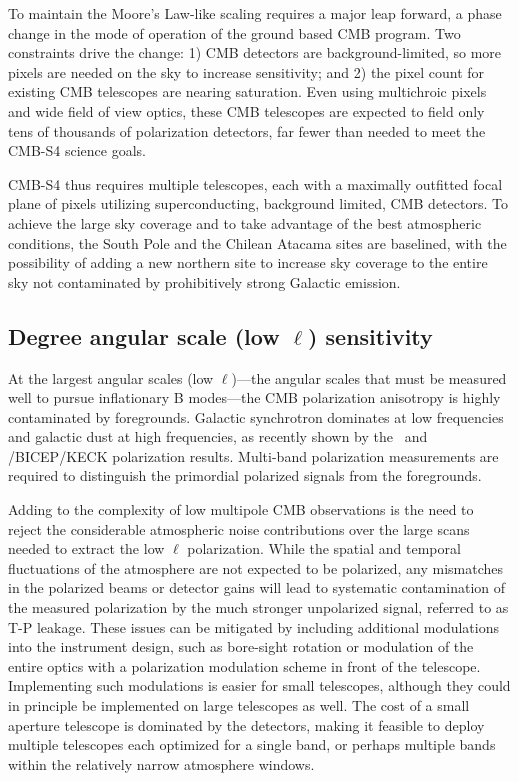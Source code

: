 To maintain the Moore's Law-like scaling requires a major leap forward, a phase change in the mode of operation of the ground based CMB program.  Two constraints drive the change:  1) CMB detectors are background-limited, so more pixels are needed on the sky to increase sensitivity; and 2) the pixel count for existing CMB telescopes are nearing saturation.  Even using multichroic pixels and wide field of view optics, these CMB telescopes are expected to field only tens of thousands of polarization detectors, far fewer than needed to meet the CMB-S4 science goals. 

CMB-S4 thus requires multiple telescopes, each with a maximally outfitted focal plane of pixels utilizing superconducting, background limited, CMB detectors. To achieve the large sky coverage and to take advantage of the best atmospheric conditions, the South Pole and the Chilean Atacama sites are baselined, with the possibility of adding a new northern site to increase sky coverage to the entire sky not contaminated by prohibitively strong Galactic emission.

\subsection{Degree angular scale (low $\ell$) sensitivity}

At the largest angular scales (low $\ell$)---the angular scales that must be measured well to pursue inflationary 
B modes---the CMB polarization anisotropy is highly contaminated by foregrounds. Galactic synchrotron dominates at low frequencies and galactic dust at high frequencies, as recently shown by the \planck\ and \planck/BICEP/KECK polarization results. Multi-band polarization measurements are required to distinguish the primordial polarized signals from the foregrounds. 

Adding to the complexity of low multipole CMB observations is the need to reject the considerable atmospheric noise contributions over the large scans needed to extract the low 
$\ell$ polarization. While the spatial and temporal fluctuations of the atmosphere are not expected to be polarized, any mismatches in the polarized beams or detector gains will lead to systematic contamination of the measured polarization by the much stronger unpolarized signal, referred to as T-P leakage. These issues can be mitigated by including additional modulations into the instrument design, such as bore-sight rotation or modulation of the entire optics with a polarization modulation scheme in front of the telescope. Implementing such modulations is easier for small telescopes, although they could in principle be implemented on large telescopes as well. The cost of a small aperture telescope is dominated by the detectors, making it feasible to deploy multiple telescopes each optimized for a single band, or perhaps multiple bands within the relatively narrow atmosphere windows.

